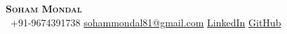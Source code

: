 \begin{center}
    \textbf{\LARGE \scshape Soham Mondal} \\ \vspace{-1mm}
    \smallskip
    \smallskip
    \smallskip
     \ \small +91-9674391738 \quad
    \href{mailto:sohammondal81@gmail.com}{ {sohammondal81@gmail.com}} \quad
    \href{https://www.linkedin.com/in/soham-mondal-2726a2207/}{ {LinkedIn}} \quad
    \href{https://github.com/Spacenaut47}{ {GitHub}}
\end{center}
